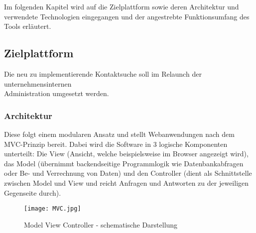 Im folgenden Kapitel wird auf die Zielplattform sowie deren Architektur und verwendete Technologien eingegangen und der angestrebte Funktionsumfang des Tools erläutert.

\subsection{Zielplattform}
    Die neu zu implementierende Kontaktsuche soll im Relaunch der unternehmensinternen\\Administration umgesetzt werden.

    \subsubsection{Architektur}
    \label{sec:arch}
        Diese folgt einem modularen Ansatz und stellt Webanwendungen nach dem MVC-Prinzip bereit. Dabei wird die Software in 3 logische Komponenten unterteilt: Die View (Ansicht, welche beispielsweise im Browser angezeigt wird), das Model (übernimmt backendseitige Programmlogik wie Datenbankabfragen oder Be- und Verrechnung von Daten) und den Controller (dient als Schnittstelle zwischen Model und View und reicht Anfragen und Antworten zu der jeweiligen Gegenseite durch).

        \vspace{0.5cm}
        \begin{figure}[h]
            \centering
            \texttt{[image: MVC.jpg]}
            \caption{Model View Controller - schematische Darstellung}
        \end{figure}

